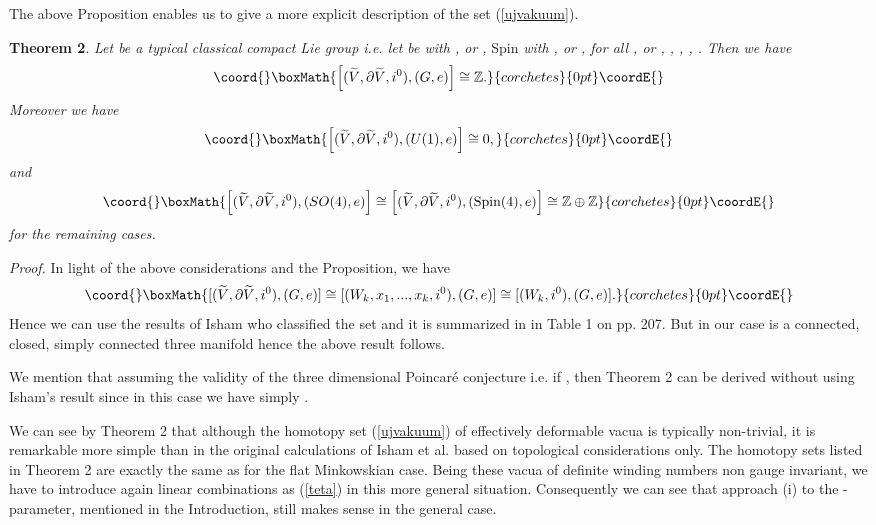 \documentclass[a4paper,12pt,draft]{article}
\providecommand{\Z}{{\mathbb Z}}
\begin{document}
\noindent The above Proposition enables us to give a more explicit
description of the set (\ref{ujvakuum}).
\vspace{0.1in}

{\bf Theorem 2}. {\it Let \coordHE{} be a typical classical compact Lie group
i.e. let \coordHE{} be \coordHE{} with \coordHE{}, or \coordHE{},} Spin\coordHE{} {\it with
\coordHE{}, or \coordHE{}, \coordHE{} for all \coordHE{}, or
\coordHE{}, \coordHE{}, \coordHE{}, \coordHE{}, \coordHE{}. Then we have
\[\coord{}\boxMath{\left[ (\widetilde{V}, \partial\widetilde{V}, i^0), (G,
e)\right]\cong\Z .}{corchetes}{0pt}\coordE{}\]
Moreover we have  
\[\coord{}\boxMath{\left[ (\widetilde{V}, \partial\widetilde{V}, i^0), (U(1),    
e)\right]\cong 0,}{corchetes}{0pt}\coordE{}\]
and}
\[\coord{}\boxMath{\left[ (\widetilde{V}, \partial\widetilde{V}, i^0), (SO(4),
e)\right]\cong\left[ (\widetilde{V},
\partial\widetilde{V}, i^0), (\mbox{Spin}(4), e)\right]\cong
\Z\oplus\Z}{corchetes}{0pt}\coordE{}\]
{\it for the remaining cases.}
\vspace{0.1in}

{\it Proof.} In light of the above considerations and the Proposition, we
have 
\[\coord{}\boxMath{[(\widetilde{V}, \partial\widetilde{V}, i^0), (G,e)]\cong [(W_k,
x_1,...,x_k, i^0), (G,e)]\cong [(W_k, i^0), (G,e)].}{corchetes}{0pt}\coordE{}\]
Hence we can use the results of Isham who classified the set \myHighlight{$[(W_k,
i^0), (G,e)]$}\coordHE{} and it is summarized in \cite{isham1} in Table 1 on pp. 207.
But in our case \coordHE{} is a connected, closed, simply connected
three manifold hence the above result follows. \myHighlight{$\Diamond$}\coordHE{}
\vspace{0.1in}

 We mention that assuming the validity of the three
dimensional Poincar\'e conjecture i.e. if \coordHE{}, then Theorem 2
can be derived without using Isham's result since in this case we have
simply \coordHE{}.

We can see by Theorem 2 that although the homotopy set
(\ref{ujvakuum}) of effectively deformable vacua is typically non-trivial,
it is remarkable more simple than in the original calculations of Isham et
al. based on topological considerations only. The homotopy sets listed in
Theorem 2 are exactly the same as for the flat Minkowskian case.
Being these vacua of definite winding numbers non gauge invariant, we have
to introduce again linear combinations as (\ref{teta}) in this more
general situation. Consequently we can see that approach (i) to the
\myHighlight{$\theta$}\coordHE{}-parameter, mentioned in the Introduction, still makes sense in
the general case.
 
\end{document}
